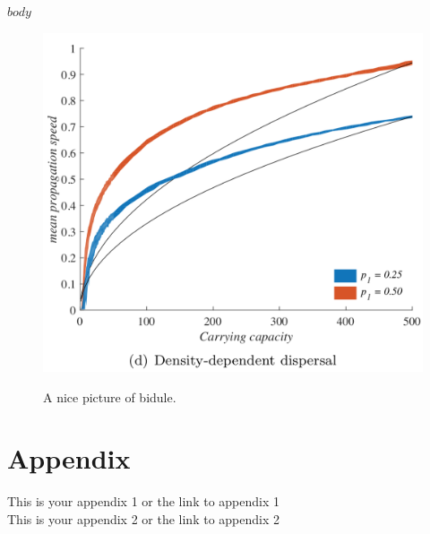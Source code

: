 \documentclass[a4paper]{article}
\begin{document}
\beginingpreprint


$body$


\begin{figure}
  \captionsetup{justification=centering}
  \caption{A nice picture of bidule.}
  \centering
  \includegraphics[scale=0.5]{fig.png}
  \label{Fig1}
\end{figure}



\printbibliography[notcategory=ignore]

\section*{Appendix}
This is your appendix 1 or the link to appendix 1 \\
This is your appendix 2 or the link to appendix 2
\end{document}
